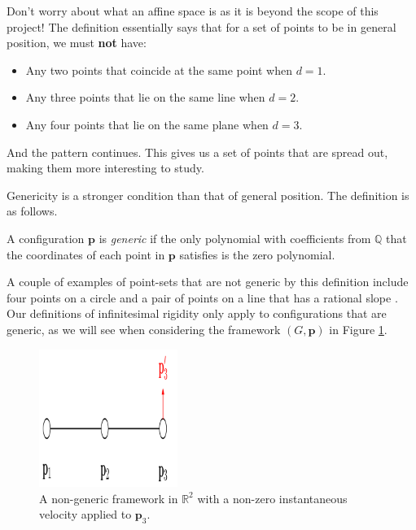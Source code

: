 \begin{flushleft}
Don't worry about what an affine space is as it is beyond the scope of this project! The definition essentially says that for a set of points to be in general position, we must \textbf{not} have:
\begin{itemize}
    \item Any two points that coincide at the same point when $d = 1$.
    \vspace{-3mm}
    \item Any three points that lie on the same line when $d = 2$.
    \vspace{-3mm}
    \item Any four points that lie on the same plane when $d = 3$.
\end{itemize}

And the pattern continues. This gives us a set of points that are spread out, making them more interesting to study.
\end{flushleft}

\begin{flushleft}
Genericity is a stronger condition than that of general position. The definition is as follows.
\end{flushleft}

\begin{definition}
A configuration $\mathbf{p}$ is \textit{generic} if the only polynomial with coefficients from $\mathbb{Q}$ that the coordinates of each point in $\mathbf{p}$ satisfies is the zero polynomial.
\end{definition}

\begin{flushleft}
A couple of examples of point-sets that are not generic by this definition include four points on a circle and a pair of points on a line that has a rational slope \cite{textbook}. Our definitions of infinitesimal rigidity only apply to configurations that are generic, as we will see when considering the framework $(G,\mathbf{p})$ in Figure \ref{fig: non-generic}.
\end{flushleft}

\begin{figure}[htbp]
    \centering
    \includegraphics[width = 0.4\textwidth]{Chapter 2/16. generically_rigid.png}
    \caption{A non-generic framework in $\mathbb{R}^2$ with a non-zero instantaneous velocity applied to $\mathbf{p}_3$.}
    \label{fig: non-generic}
\end{figure}

